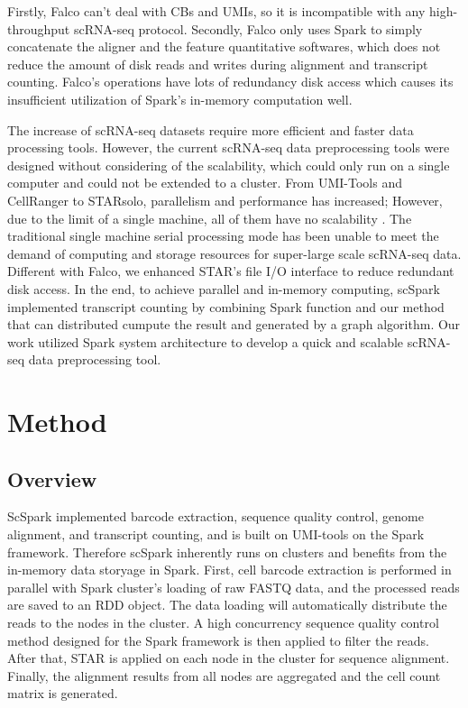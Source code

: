 \documentclass[conference]{IEEEtran}
\begin{document}
Firstly, Falco can't deal with CBs and UMIs, so it is incompatible with any high-throughput scRNA-seq protocol.
Secondly, Falco only uses Spark to simply concatenate the aligner and the feature quantitative softwares, which does not reduce the amount of disk reads and writes during alignment and transcript counting.
Falco’s operations have lots of redundancy disk access which causes its insufficient utilization of Spark’s in-memory computation well. 

The increase of scRNA-seq datasets require more efficient and faster data processing tools.
However, the current scRNA-seq data preprocessing tools were designed without considering of the scalability, which could only run on a single computer and could not be extended to a cluster. From UMI-Tools and CellRanger to STARsolo, parallelism and performance has increased; However, due to the limit of a single machine, all of them have no scalability . 
The traditional single machine serial processing mode has been unable to meet the demand of computing and storage resources for super-large scale scRNA-seq data.
Different with Falco, we enhanced STAR's file I/O interface to reduce redundant disk access.
In the end, to achieve parallel and in-memory computing, scSpark implemented transcript counting by combining Spark function and our method that can distributed cumpute the result and generated by a graph algorithm.
Our work utilized Spark system architecture to develop a quick and scalable scRNA-seq data preprocessing tool. 

\fi


\section{Method}
\subsection{Overview}

ScSpark implemented barcode extraction, sequence quality control, genome alignment, and transcript counting, and is built on UMI-tools on the Spark framework. 
Therefore scSpark inherently runs on clusters and benefits from the in-memory data storyage in Spark. 
First, cell barcode extraction is performed in parallel with Spark cluster's loading of raw FASTQ data, and the processed reads are saved to an RDD object. 
The data loading will automatically distribute the reads to the nodes in the cluster. %
A high concurrency sequence quality control method designed for the Spark framework is then applied to filter the reads. 
After that, STAR is applied on each node in the cluster for sequence alignment. 
Finally, the alignment results from all nodes are aggregated and the cell count matrix is generated. 
\end{document}
